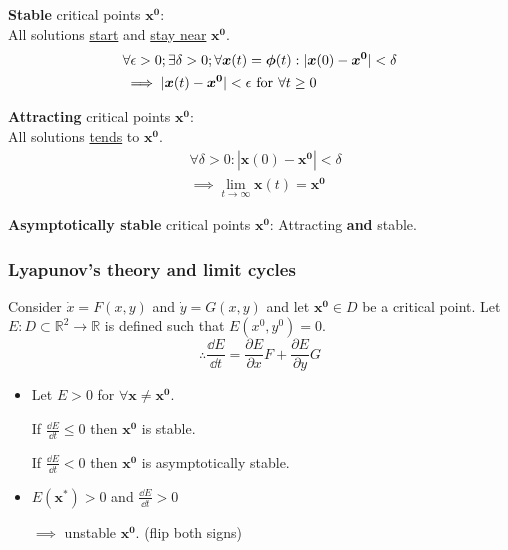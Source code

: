\documentclass{article}
\begin{document}
\begin{multicols}{3}
\textbf{Stable} critical points $\boldsymbol{x^0}$: \\
All solutions \underline{start} and \underline{stay near} $\boldsymbol{x^0}$.
\begin{align*}
    &\forall\epsilon>0;\exists\delta>0;\forall
    \boldsymbol{x}(t)=\boldsymbol{\phi}(t):
    |\boldsymbol{x}(0)-\boldsymbol{x^0}|<\delta \\
    &\implies |\boldsymbol{x}(t)-\boldsymbol{x^0}|<\epsilon
    \hspace{0.05in}\text{for}\hspace{0.05in}\forall t \geq 0
\end{align*}

\textbf{Attracting} critical points $\boldsymbol{x^0}$: \\
All solutions \underline{tends} to $\boldsymbol{x^0}$.
\begin{align*}
    &\forall\delta>0:|\boldsymbol{x}(0)-\boldsymbol{x^0}|<\delta \\
    &\implies\lim_{t\rightarrow\infty}
    \boldsymbol{x}(t)=\boldsymbol{x^0}
\end{align*}

\textbf{Asymptotically stable} critical points $\boldsymbol{x^0}$:
Attracting \textbf{and} stable.

\subsubsection*{Lyapunov's theory and limit cycles}
Consider $\dot{x}=F(x, y)$ and $\dot{y}=G(x, y)$
and let $\boldsymbol{x^0} \in D$ be a critical point.
Let $E:D\subset\mathbb{R}^2\rightarrow\mathbb{R}$
is defined such that $E(x^0, y^0)=0$.
$$\therefore\frac{\dd E}{\dd t}=\frac{\partial E}{\partial x} F
+\frac{\partial E}{\partial y} G$$
\begin{itemize}
    \item Let $E>0$ for $\forall \boldsymbol{x} \neq \boldsymbol{x^0}$.
        
    If $\frac{\dd E}{\dd t} \leq 0$ then $\boldsymbol{x^0}$ is stable.

    If $\frac{\dd E}{\dd t} < 0$ then $\boldsymbol{x^0}$ is asymptotically stable.

    \item $E(\boldsymbol{x^*})>0$ and $\frac{\dd E}{\dd t}>0$
    
    $\implies$ unstable $\boldsymbol{x^0}$.
    (flip both signs)
\end{itemize}

\newpage


\end{multicols}
\end{document}
